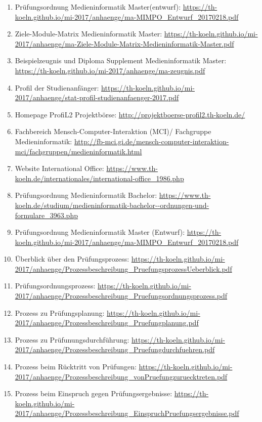 \documentclass[BCOR12mm,DIV11,titlepage,a4paper,oneside,10pt]{scrbook}
\begin{document}
\begin{sloppypar}
\begin{flushleft}
\begin{enumerate}
\item{Prüfungsordnung Medieninformatik Master(entwurf): \url{https://th-koeln.github.io/mi-2017/anhaenge/ma-MIMPO\_Entwurf\_20170218.pdf} } 
\item{Ziele-Module-Matrix Medieninformatik Master: \url{https://th-koeln.github.io/mi-2017/anhaenge/ma-Ziele-Module-Matrix-Medieninformatik-Master.pdf} } 
\item{Beispielzeugnis und Diploma Supplement Medieninformatik Master: \url{https://th-koeln.github.io/mi-2017/anhaenge/ma-zeugnis.pdf} } 
\item{Profil der Studienanfänger: \url{https://th-koeln.github.io/mi-2017/anhaenge/stat-profil-studienanfaenger-2017.pdf} } 
\item{Homepage ProfiL2 Projektbörse: \url{http://projektboerse-profil2.th-koeln.de/} } 
\item{Fachbereich Mensch-Computer-Interaktion (MCI)/ Fachgruppe Medieninformatik: \url{http://fb-mci.gi.de/mensch-computer-interaktion-mci/fachgruppen/medieninformatik.html} } 
\item{Website International Office: \url{https://www.th-koeln.de/internationales/international-office\_1986.php} } 
\item{Prüfungsordnung Medieninformatik Bachelor: \url{https://www.th-koeln.de/studium/medieninformatik-bachelor--ordnungen-und-formulare\_3963.php} } 
\item{Prüfungsordnung Medieninformatik Master (Entwurf): \url{https://th-koeln.github.io/mi-2017/anhaenge/ma-MIMPO\_Entwurf\_20170218.pdf} } 
\item{Überblick über den Prüfungsprozess: \url{https://th-koeln.github.io/mi-2017/anhaenge/Prozessbeschreibung\_PruefungsprozessUeberblick.pdf} } 
\item{Prüfungsordnungsprozess: \url{https://th-koeln.github.io/mi-2017/anhaenge/Prozessbeschreibung\_Pruefungsordnungsprozess.pdf} } 
\item{Prozess zu Prüfungsplanung: \url{https://th-koeln.github.io/mi-2017/anhaenge/Prozessbeschreibung\_Pruefungplanung.pdf} } 
\item{Prozess zu Prüfunungsdurchführung: \url{https://th-koeln.github.io/mi-2017/anhaenge/Prozessbeschreibung\_Pruefungdurchfuehren.pdf} } 
\item{Prozess beim Rücktritt von Prüfungen: \url{https://th-koeln.github.io/mi-2017/anhaenge/Prozessbeschreibung\_vonPruefungzuruecktreten.pdf} } 
\item{Prozess beim Einspruch gegen Prüfungsergebnisse: \url{https://th-koeln.github.io/mi-2017/anhaenge/Prozessbeschreibung\_EinspruchPruefungsergebnisse.pdf} } 

\end{enumerate}
\end{flushleft}
\end{sloppypar}
\end{document}
